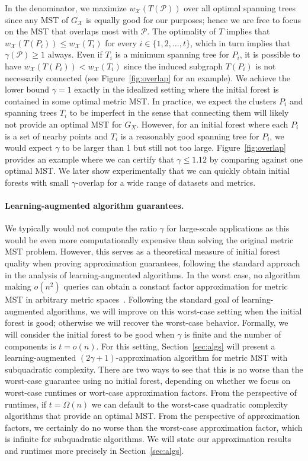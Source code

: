 In the denominator, we maximize $w_\mathcal{X}(T(\mathcal{P}))$ over all optimal spanning trees since any MST of $G_\mathcal{X}$ is equally good for our purposes; hence we are free to focus on the MST that overlaps most with $\mathcal{P}$. The optimality of $T$ implies that $w_\mathcal{X}(T(P_i)) \leq w_\mathcal{X}(T_i)$ for every $i \in \{1,2, \hdots, t\}$, which in turn implies that $\gamma(\mathcal{P}) \geq 1$ always. Even if $T_i$ is a minimum spanning tree for $P_i$, it is possible to have $w_\mathcal{X}(T(P_i)) < w_\mathcal{X}(T_i)$ since the induced subgraph $T(P_i)$ is not necessarily connected (see Figure~\ref{fig:overlap} for an example). We achieve the lower bound $\gamma = 1$ exactly in the idealized setting where the initial forest is contained in some optimal metric MST. In practice, we expect the clusters $P_i$ and spanning trees $T_i$ to be imperfect in the sense that connecting them will likely not provide an optimal MST for $G_X$. However, for an initial forest where each $P_i$ is a set of nearby points and $T_i$ is a reasonably good spanning tree for $P_i$, we would expect $\gamma$ to be larger than 1 but still not too large. Figure~\ref{fig:overlap} provides an example where we can certify that $\gamma \leq 1.12$ by comparing against one optimal MST. We later show experimentally that we can quickly obtain initial forests with small $\gamma$-overlap for a wide range of datasets and metrics. 

\paragraph{Learning-augmented algorithm guarantees.}
 We typically would not compute the ratio $\gamma$ for large-scale applications as this would be even more computationally expensive than solving the original metric MST problem. However, this serves as a theoretical measure of initial forest quality when proving approximation guarantees, following the standard approach in the analysis of learning-augmented algorithms. 
In the worst case, no algorithm making $o(n^2)$ queries can obtain a constant factor approximation for metric MST in arbitrary metric spaces~\cite{indyk1999sublinear}.  Following the standard goal of learning-augmented algorithms, we will improve on this worst-case setting when the initial forest is good; otherwise we will recover the worst-case behavior. Formally, we will consider the initial forest to be good when $\gamma$ is finite and the number of components is $t = o(n)$. For this setting, Section~\ref{sec:algs} will present a learning-augmented $(2\gamma+1)$-approximation algorithm for metric MST with subquadratic complexity. There are two ways to see that this is no worse than the worst-case guarantee using no initial forest, depending on whether we focus on worst-case runtimes or wort-case approximation factors. From the perspective of runtimes, if $t = \Omega(n)$ we can default to the worst-case quadratic complexity algorithms that provide an optimal MST. From the perspective of approximation factors, we certainly do no worse than the worst-case approximation factor, which is infinite for subquadratic algorithms. We will state our approximation results and runtimes more precisely in Section~\ref{sec:algs}.


